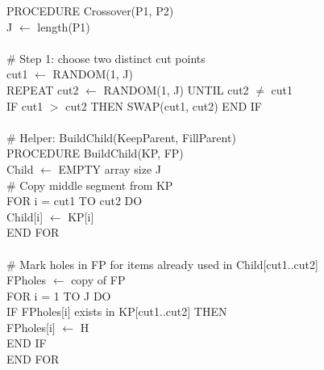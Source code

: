 \documentclass[10pt,twocolumn]{article}
\begin{document}
{\small\ttfamily
PROCEDURE Crossover(P1, P2)\\
\hspace*{5pt}J $\leftarrow$ length(P1)\\
\\
\hspace*{5pt}\# Step 1: choose two distinct cut points\\
\hspace*{5pt}cut1 $\leftarrow$ RANDOM(1, J)\\
\hspace*{5pt}REPEAT cut2 $\leftarrow$ RANDOM(1, J) UNTIL cut2 $\neq$ cut1\\
\hspace*{5pt}IF cut1 $>$ cut2 THEN SWAP(cut1, cut2) END IF\\
\\
\hspace*{5pt}\# Helper: BuildChild(KeepParent, FillParent)\\
\hspace*{5pt}PROCEDURE BuildChild(KP, FP)\\
\hspace*{10pt}Child $\leftarrow$ EMPTY array size J\\
\hspace*{10pt}\# Copy middle segment from KP\\
\hspace*{10pt}FOR i = cut1 TO cut2 DO\\
\hspace*{15pt}Child[i] $\leftarrow$ KP[i]\\
\hspace*{10pt}END FOR\\
\\
\hspace*{10pt}\# Mark holes in FP for items already used in Child[cut1..cut2]\\
\hspace*{10pt}FPholes $\leftarrow$ copy of FP\\
\hspace*{10pt}FOR i = 1 TO J DO\\
\hspace*{15pt}IF FPholes[i] exists in KP[cut1..cut2] THEN\\
\hspace*{20pt}FPholes[i] $\leftarrow$ H\\
\hspace*{15pt}END IF\\
\hspace*{10pt}END FOR\\
}
\end{document}
